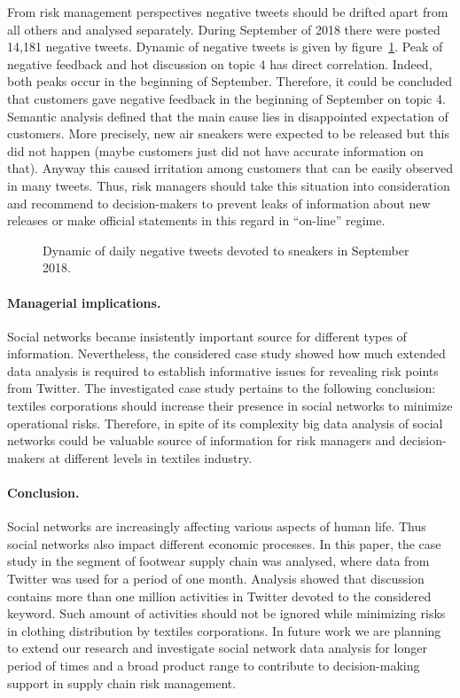 From risk management perspectives negative tweets should be drifted apart from all others and analysed separately. During September of 2018 there were posted 14,181 negative tweets. Dynamic of negative tweets is given by figure~\cref{fig:dailyNegativeTweetDynamics}. Peak of negative feedback and hot discussion on topic 4 has direct correlation. Indeed, both peaks occur in the beginning of September. Therefore, it could be concluded that customers gave negative feedback in the beginning of September on topic 4. Semantic analysis defined that the main cause lies in disappointed expectation of customers. More precisely, new air sneakers were expected to be released but this did not happen (maybe customers just did not have accurate information on that). Anyway this caused irritation among customers that can be easily observed in many tweets. Thus, risk managers should take this situation into consideration and recommend to decision-makers to prevent leaks of information about new releases or make official statements in this regard in “on-line” regime.

\begin{figure}[ht]
	\caption{Dynamic of daily negative tweets devoted to sneakers in September 2018.}\label{fig:dailyNegativeTweetDynamics}
\end{figure}

\paragraph{Managerial implications.} Social networks became insistently important source for different types of information. Nevertheless, the considered case study showed how much extended data analysis is required to establish informative issues for revealing risk points from Twitter. The investigated case study pertains to the following conclusion: textiles corporations should increase their presence in social networks to minimize operational risks. Therefore, in spite of its complexity big data analysis of social networks could be valuable source of information for risk managers and decision-makers at different levels in textiles industry.

\paragraph{Conclusion.} Social networks are increasingly affecting various aspects of human life. Thus social networks also impact different economic processes. In this paper, the case study in the segment of footwear supply chain was analysed, where data from Twitter was used for a period of one month. Analysis showed that discussion contains more than one million activities in Twitter devoted to the considered keyword. Such amount of activities should not be ignored while minimizing risks in clothing distribution by textiles corporations. In future work we are planning to extend our research and investigate social network data analysis for longer period of times and a broad product range to contribute to decision-making support in supply chain risk management.

